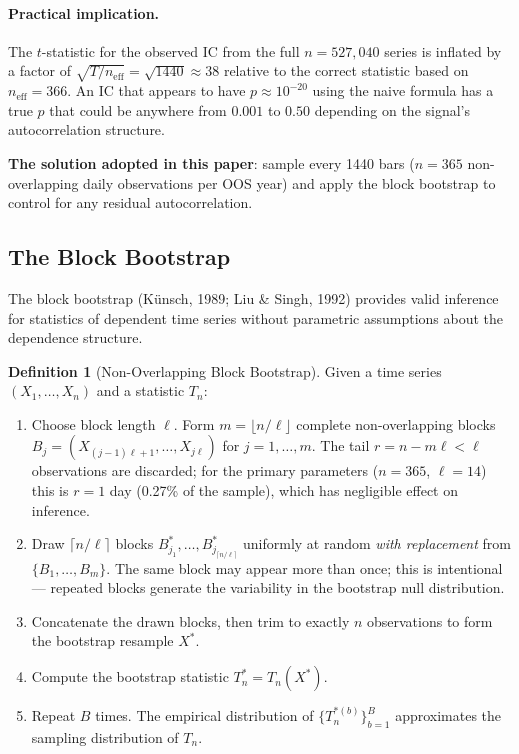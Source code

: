 \documentclass[12pt, a4paper]{article}
\theoremstyle{plain}
\theoremstyle{definition}
\newtheorem{definition}{Definition}[section]
\begin{document}
\paragraph{Practical implication.}
The $t$-statistic for the observed IC from the full $n = 527{,}040$ series is
inflated by a factor of $\sqrt{T / n_{\mathrm{eff}}} = \sqrt{1440} \approx 38$
relative to the correct statistic based on $n_{\mathrm{eff}} = 366$. An IC
that appears to have $p \approx 10^{-20}$ using the naive formula has a true
$p$ that could be anywhere from $0.001$ to $0.50$ depending on the signal's
autocorrelation structure.

\textbf{The solution adopted in this paper}: sample every 1440 bars
($n = 365$ non-overlapping daily observations per OOS year) and apply the
block bootstrap to control for any residual autocorrelation.

\subsection{The Block Bootstrap}
\label{sec:bootstrap}

The block bootstrap (Künsch, 1989; Liu \& Singh, 1992) provides valid inference
for statistics of dependent time series without parametric assumptions about
the dependence structure.

\begin{definition}[Non-Overlapping Block Bootstrap]
  Given a time series $(X_1, \ldots, X_n)$ and a statistic $T_n$:
  \begin{enumerate}
    \item Choose block length $\ell$.  Form $m = \lfloor n/\ell \rfloor$
          complete non-overlapping blocks
          $B_j = (X_{(j-1)\ell+1}, \ldots, X_{j\ell})$ for $j = 1, \ldots, m$.
          The tail $r = n - m\ell < \ell$ observations are discarded; for the
          primary parameters ($n = 365$, $\ell = 14$) this is $r = 1$ day
          (0.27\% of the sample), which has negligible effect on inference.
    \item Draw $\lceil n/\ell \rceil$ blocks
          $B_{j_1}^*, \ldots, B_{j_{\lceil n/\ell\rceil}}^*$ uniformly
          at random \emph{with replacement} from $\{B_1, \ldots, B_m\}$.
          The same block may appear more than once; this is intentional ---
          repeated blocks generate the variability in the bootstrap null
          distribution.
    \item Concatenate the drawn blocks, then trim to exactly $n$ observations
          to form the bootstrap resample $X^*$.
    \item Compute the bootstrap statistic $T_n^* = T_n(X^*)$.
    \item Repeat $B$ times. The empirical distribution of
          $\{T_n^{*(b)}\}_{b=1}^B$ approximates the sampling distribution
          of $T_n$.
  \end{enumerate}
\end{definition}
\end{document}
